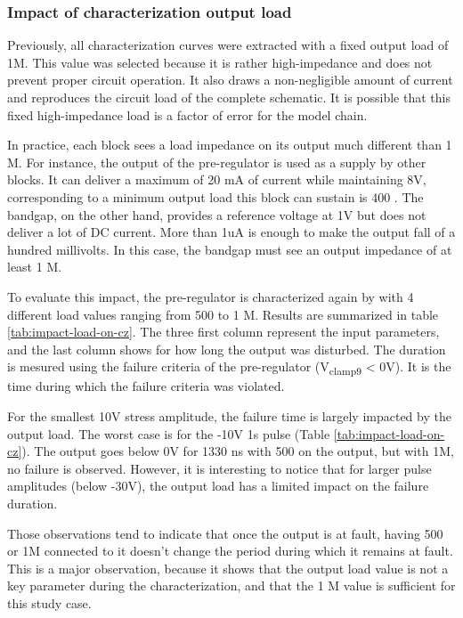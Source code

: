 \subsubsection{Impact of characterization output load}

Previously, all characterization curves were extracted with a fixed output load of 1M\textOmega{}.
This value was selected because it is rather high-impedance and does not prevent proper circuit operation.
It also draws a non-negligible amount of current and reproduces the circuit load of the complete schematic.
It is possible that this fixed high-impedance load is a factor of error for the model chain.

In practice, each block sees a load impedance on its output much different than 1 M\textOmega{}.
For instance, the output of the pre-regulator is used as a supply by other blocks.
It can deliver a maximum of 20 mA of current while maintaining 8V, corresponding to a minimum output load this block can sustain is 400 \textOmega{}.
The bandgap, on the other hand, provides a reference voltage at 1V but does not deliver a lot of DC current.
More than 1uA is enough to make the output fall of a hundred millivolts.
In this case, the bandgap must see an output impedance of at least 1 M\textOmega{}.

To evaluate this impact, the pre-regulator is characterized again by with 4 different load values ranging from 500 \textOmega{} to 1 M\textOmega{}.
Results are summarized in table \ref{tab:impact-load-on-cz}.
The three first column represent the input parameters, and the last column shows for how long the output was disturbed.
The duration is mesured using the failure criteria of the pre-regulator (V\textsubscript{clamp9} < 0V).
It is the time during which the failure criteria was violated.

For the smallest 10V stress amplitude, the failure time is largely impacted by the output load.
The worst case is for the -10V 1\textmugreek{}s pulse (Table \ref{tab:impact-load-on-cz}).
The output goes below 0V for 1330 ns with 500\textOmega{} on the output, but with 1M\textOmega{}, no failure is observed.
However, it is interesting to notice that for larger pulse amplitudes (below -30V), the output load has a limited impact on the failure duration.

Those observations tend to indicate that once the output is at fault, having 500\textOmega{} or 1M\textOmega{} connected to it doesn't change the period during which it remains at fault.
This is a major observation, because it shows that the output load value is not a key parameter during the characterization, and that the 1 M\textOmega{} value is sufficient for this study case.

